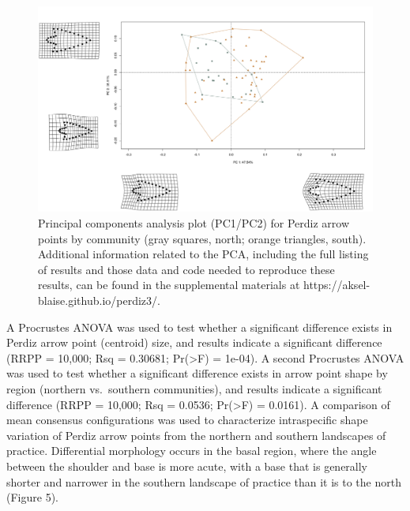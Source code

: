 \documentclass[smallextended]{svjour3}       %
\begin{document}
\begin{figure}
\includegraphics[width=1\linewidth]{ms-figs/figure4} \caption{Principal components analysis plot (PC1/PC2) for Perdiz arrow points by community (gray squares, north; orange triangles, south). Additional information related to the PCA, including the full listing of results and those data and code needed to reproduce these results, can be found in the supplemental materials at https://aksel-blaise.github.io/perdiz3/.}\label{fig:fig4}
\end{figure}

A Procrustes ANOVA was used to test whether a significant difference
exists in Perdiz arrow point (centroid) size, and results indicate a
significant difference (RRPP = 10,000; Rsq = 0.30681; Pr(\textgreater F)
= 1e-04). A second Procrustes ANOVA was used to test whether a
significant difference exists in arrow point shape by region (northern
vs.~southern communities), and results indicate a significant difference
(RRPP = 10,000; Rsq = 0.0536; Pr(\textgreater F) = 0.0161). A comparison
of mean consensus configurations was used to characterize intraspecific
shape variation of Perdiz arrow points from the northern and southern
landscapes of practice. Differential morphology occurs in the basal
region, where the angle between the shoulder and base is more acute,
with a base that is generally shorter and narrower in the southern
landscape of practice than it is to the north (Figure 5).
\end{document}
